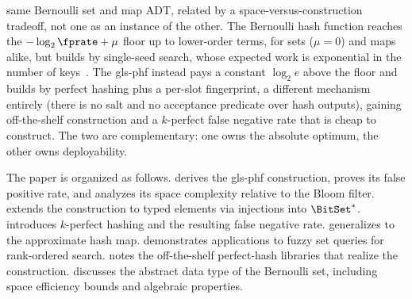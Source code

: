 \documentclass[ ../main.tex]{subfiles}
\begin{document}
same Bernoulli set and map ADT, related by a space-versus-construction tradeoff,
not one as an instance of the other. The Bernoulli hash function reaches the
$-\log_2 \fprate + \mu$ floor up to lower-order terms, for sets ($\mu = 0$) and maps alike, but
builds by single-seed search, whose expected work is exponential in the
number of keys~\cite{lehmann2025seeds}. The \gls{gls-phf} instead pays a
constant $\log_2 e$ above the floor and builds by perfect hashing plus a per-slot
fingerprint, a different mechanism entirely (there is no salt and no acceptance
predicate over hash outputs), gaining off-the-shelf construction and a
$k$-perfect false negative rate that is cheap to construct. The two are complementary: one owns the
absolute optimum, the other owns deployability.

The paper is organized as follows.
 derives the \gls{gls-phf} construction, proves its false
positive rate, and analyzes its space complexity relative to the Bloom filter.
 extends the construction to typed elements via injections
into $\BitSet^*$.
 introduces $k$-perfect hashing and the resulting false
negative rate.
 generalizes to the approximate hash map.
 demonstrates applications to fuzzy set queries for
rank-ordered search.
 notes the off-the-shelf perfect-hash libraries that realize the
construction.
 discusses the abstract data type of the Bernoulli set, including
space efficiency bounds and algebraic properties.
\end{document}
